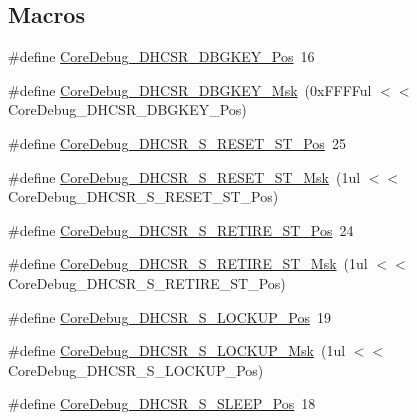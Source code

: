 \subsection*{Macros}
\begin{DoxyCompactItemize}
\item 
\#define \hyperlink{group__CMSIS__CM3__CoreDebug_gac91280edd0ce932665cf75a23d11d842}{Core\+Debug\+\_\+\+D\+H\+C\+S\+R\+\_\+\+D\+B\+G\+K\+E\+Y\+\_\+\+Pos}~16
\item 
\#define \hyperlink{group__CMSIS__CM3__CoreDebug_ga1ce997cee15edaafe4aed77751816ffc}{Core\+Debug\+\_\+\+D\+H\+C\+S\+R\+\_\+\+D\+B\+G\+K\+E\+Y\+\_\+\+Msk}~(0x\+F\+F\+F\+Ful $<$$<$ Core\+Debug\+\_\+\+D\+H\+C\+S\+R\+\_\+\+D\+B\+G\+K\+E\+Y\+\_\+\+Pos)
\item 
\#define \hyperlink{group__CMSIS__CM3__CoreDebug_ga6f934c5427ea057394268e541fa97753}{Core\+Debug\+\_\+\+D\+H\+C\+S\+R\+\_\+\+S\+\_\+\+R\+E\+S\+E\+T\+\_\+\+S\+T\+\_\+\+Pos}~25
\item 
\#define \hyperlink{group__CMSIS__CM3__CoreDebug_gac474394bcceb31a8e09566c90b3f8922}{Core\+Debug\+\_\+\+D\+H\+C\+S\+R\+\_\+\+S\+\_\+\+R\+E\+S\+E\+T\+\_\+\+S\+T\+\_\+\+Msk}~(1ul $<$$<$ Core\+Debug\+\_\+\+D\+H\+C\+S\+R\+\_\+\+S\+\_\+\+R\+E\+S\+E\+T\+\_\+\+S\+T\+\_\+\+Pos)
\item 
\#define \hyperlink{group__CMSIS__CM3__CoreDebug_ga2328118f8b3574c871a53605eb17e730}{Core\+Debug\+\_\+\+D\+H\+C\+S\+R\+\_\+\+S\+\_\+\+R\+E\+T\+I\+R\+E\+\_\+\+S\+T\+\_\+\+Pos}~24
\item 
\#define \hyperlink{group__CMSIS__CM3__CoreDebug_ga89dceb5325f6bcb36a0473d65fbfcfa6}{Core\+Debug\+\_\+\+D\+H\+C\+S\+R\+\_\+\+S\+\_\+\+R\+E\+T\+I\+R\+E\+\_\+\+S\+T\+\_\+\+Msk}~(1ul $<$$<$ Core\+Debug\+\_\+\+D\+H\+C\+S\+R\+\_\+\+S\+\_\+\+R\+E\+T\+I\+R\+E\+\_\+\+S\+T\+\_\+\+Pos)
\item 
\#define \hyperlink{group__CMSIS__CM3__CoreDebug_ga2900dd56a988a4ed27ad664d5642807e}{Core\+Debug\+\_\+\+D\+H\+C\+S\+R\+\_\+\+S\+\_\+\+L\+O\+C\+K\+U\+P\+\_\+\+Pos}~19
\item 
\#define \hyperlink{group__CMSIS__CM3__CoreDebug_ga7b67e4506d7f464ef5dafd6219739756}{Core\+Debug\+\_\+\+D\+H\+C\+S\+R\+\_\+\+S\+\_\+\+L\+O\+C\+K\+U\+P\+\_\+\+Msk}~(1ul $<$$<$ Core\+Debug\+\_\+\+D\+H\+C\+S\+R\+\_\+\+S\+\_\+\+L\+O\+C\+K\+U\+P\+\_\+\+Pos)
\item 
\#define \hyperlink{group__CMSIS__CM3__CoreDebug_ga349ccea33accc705595624c2d334fbcb}{Core\+Debug\+\_\+\+D\+H\+C\+S\+R\+\_\+\+S\+\_\+\+S\+L\+E\+E\+P\+\_\+\+Pos}~18
\item 

\end{DoxyCompactItemize}

